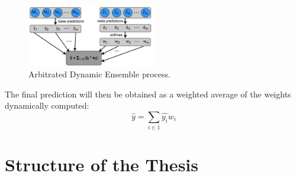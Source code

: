 \begin{figure}[H]
    \centering
    \includegraphics[width=0.50\textwidth]{Machine_learning_thesis/Images/Arbitrated Dynamic Ensemble.png}
    \caption{Arbitrated Dynamic Ensemble process.} 
    \label{fig: Arbitrated Dynamic Ensemble}
\end{figure} 
The final prediction will then be obtained as a weighted average of the weights dynamically computed: 
\[
\hat{y} = \sum_{i \in 1} \hat{y_i} w_i
\]



\section{Structure of the Thesis }
